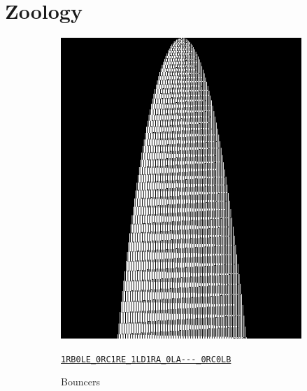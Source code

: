 \documentclass[a4paper,british]{article}
\theoremstyle{definition} %
\numberwithin{equation}{section}
\theoremstyle{definition} %
\newcommand{\tm}[1]{\href{https://bbchallenge.org/#1}{\texttt{\nolinkurl{#1}}}}
\begin{document}
\section{Zoology}\label{sec:zoo}
\vspace{-1em}
\begin{figure}[htbp]
    \centering

    \begin{subfigure}{0.3\textwidth}
        \centering
        \includegraphics[width=\linewidth]{figures/zoology/bouncer_1RB0LE_0RC1RE_1LD1RA_0LA---_0RC0LB.png}
        \caption*{Bouncers}
        {\scriptsize \tm{1RB0LE_0RC1RE_1LD1RA_0LA---_0RC0LB}}
    \end{subfigure}
    \hfill
    \begin{subfigure}{0.3\textwidth}
        \centering

\end{subfigure}
\end{figure}
\end{document}
